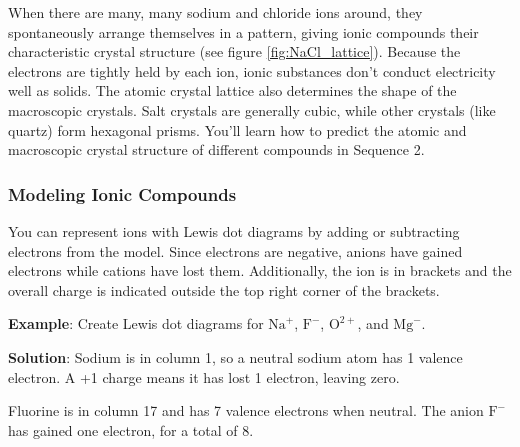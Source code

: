 When there are many, many sodium and chloride ions around, they spontaneously 
arrange themselves in a pattern, giving ionic compounds their characteristic 
crystal structure (see figure \ref{fig:NaCl_lattice}). Because the electrons are 
tightly held by each ion, ionic substances don't conduct electricity well as 
solids. The atomic crystal lattice also determines the shape of the macroscopic 
crystals. Salt crystals are generally cubic, while other crystals (like quartz) 
form hexagonal prisms. You'll learn how to predict the atomic and macroscopic 
crystal structure of different compounds in Sequence 2. 

\subsubsection{Modeling Ionic Compounds}
You can represent ions with Lewis dot diagrams by adding or subtracting electrons 
from the model. Since electrons are negative, anions have gained electrons while 
cations have lost them. Additionally, the ion is in brackets and the overall 
charge is indicated outside the top right corner of the brackets. 

\textbf{Example}: Create Lewis dot diagrams for $\text{Na}^{+}$, $\text{F}^{-}$, 
$\text{O}^{2+}$, and $\text{Mg}^{-}$.

\textbf{Solution}: Sodium is in column 1, so a neutral sodium atom has 1 valence 
electron. A +1 charge means it has lost 1 electron, leaving zero.

\begin{center}
\end{center}

Fluorine is in column 17 and has 7 valence electrons when neutral. The anion 
$\text{F}^-$ has gained one electron, for a total of 8. 

\begin{center}
\end{center}

